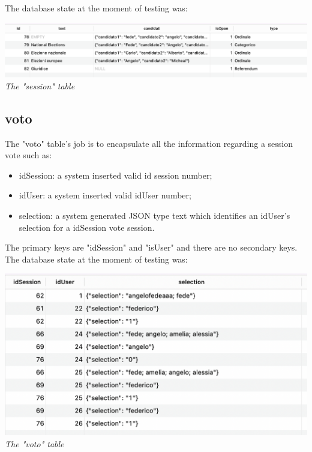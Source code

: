 \documentclass[11pt, oneside]{article}   	%
\begin{document}
The database state at the moment of testing was: 
    \begin{center}
    \includegraphics[scale=0.5]{images/voto1.png}\\
    \emph{The "session" table}
    \end{center}

\pagebreak

\subsection{voto}
The "voto" table's job is to encapsulate all the information regarding a session vote such as:
\begin{itemize}
    \item idSession: a system inserted valid id session number;
    \item idUser: a system inserted valid idUser number;
    \item selection: a system generated JSON type text which identifies an idUser's selection for a idSession vote session.
\end{itemize}
The primary keys are "idSession" and "isUser" and there are no secondary keys.\\

The database state at the moment of testing was: 
    \begin{center}
    \includegraphics[scale=0.5]{images/voto3.png}\\
    \emph{The "voto" table}
    \end{center}

\pagebreak
\end{document}
